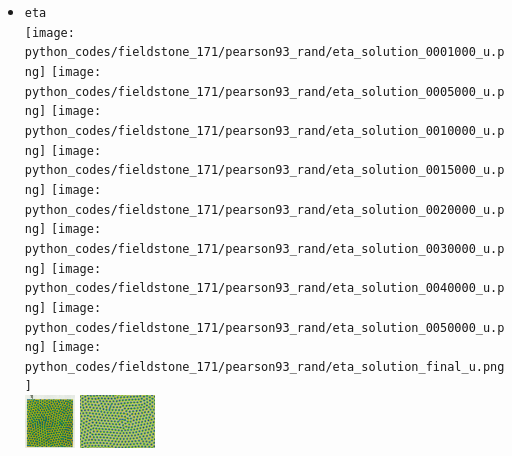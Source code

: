 \begin{itemize}
\item {\tt eta}\\
\texttt{[image: python\_codes/fieldstone\_171/pearson93\_rand/eta\_solution\_0001000\_u.png]}
\texttt{[image: python\_codes/fieldstone\_171/pearson93\_rand/eta\_solution\_0005000\_u.png]}
\texttt{[image: python\_codes/fieldstone\_171/pearson93\_rand/eta\_solution\_0010000\_u.png]}
\texttt{[image: python\_codes/fieldstone\_171/pearson93\_rand/eta\_solution\_0015000\_u.png]}
\texttt{[image: python\_codes/fieldstone\_171/pearson93\_rand/eta\_solution\_0020000\_u.png]}
\texttt{[image: python\_codes/fieldstone\_171/pearson93\_rand/eta\_solution\_0030000\_u.png]}
\texttt{[image: python\_codes/fieldstone\_171/pearson93\_rand/eta\_solution\_0040000\_u.png]}
\texttt{[image: python\_codes/fieldstone\_171/pearson93\_rand/eta\_solution\_0050000\_u.png]}
\texttt{[image: python\_codes/fieldstone\_171/pearson93\_rand/eta\_solution\_final\_u.png]}\\
\includegraphics[height=1.4cm]{python_codes/fieldstone_171/images/pear93_eta}
\includegraphics[height=1.4cm]{python_codes/fieldstone_171/images/munafo_eta}


\end{itemize}
